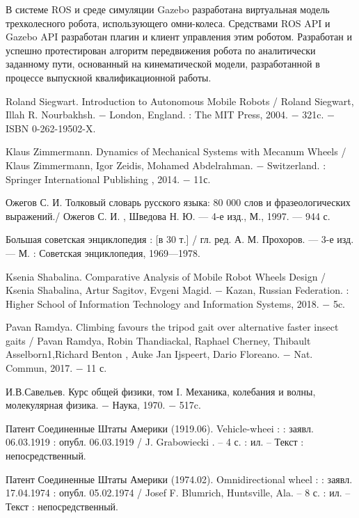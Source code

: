 \documentclass[oneside,final,14pt]{extreport}
\begin{document}
В системе ROS и  среде симуляции Gazebo разработана виртуальная модель трехколесного робота, использующего омни-колеса. Средствами ROS API и Gazebo API разработан плагин и клиент управления этим роботом. Разработан и успешно протестирован алгоритм передвижения робота по аналитически заданному пути, основанный на кинематической модели, разработанной в процессе выпускной квалификационной  работы.
\newpage
\begin{thebibliography}{0}

Roland Siegwart.
Introduction to Autonomous Mobile Robots / Roland Siegwart, Illah R. Nourbakhsh.
$-$ London, England.
: The MIT Press, 2004. $-$ 321c. $-$ ISBN 0-262-19502-X.

Klaus Zimmermann.
Dynamics of Mechanical Systems
with Mecanum Wheels / Klaus Zimmermann, Igor Zeidis, Mohamed Abdelrahman.
$-$ Switzerland. : Springer International Publishing , 2014. $-$ 11с.

Ожегов С. И. Толковый словарь русского языка: 80 000 слов и фразеологических выражений./ Ожегов С. И. , Шведова Н. Ю. — 4-е изд., М., 1997. — 944 с.


Большая советская энциклопедия : [в 30 т.] / гл. ред. А. М. Прохоров. — 3-е изд. — М. : Советская энциклопедия, 1969—1978.

Ksenia Shabalina.
Comparative Analysis of Mobile Robot Wheels
Design
/
Ksenia Shabalina, Artur Sagitov, Evgeni Magid.
$-$  Kazan, Russian Federation. : Higher School of Information Technology and Information Systems,
 2018. $-$ 5c.

Pavan Ramdya.
Climbing favours the tripod gait over alternative
faster insect gaits
/
Pavan Ramdya, Robin Thandiackal, Raphael Cherney, Thibault Asselborn1,Richard Benton ,
Auke Jan Ijspeert, Dario Floreano.
$-$ Nat. Commun, 2017. $-$  11 с.

И.В.Савельев.
Курс общей физики, том I.
Механика, колебания и волны, молекулярная физика.
$-$ Наука, 1970. $-$ 517c.

Патент  Соединенные Штаты Америки (1919.06). Vehicle-wheei :  : заявл. 06.03.1919 : опубл. 06.03.1919 / J. Grabowiecki . – 4 с. : ил. – Текст : непосредственный.

Патент  Соединенные Штаты Америки (1974.02). Omnidirectional wheel :  : заявл. 17.04.1974 : опубл. 05.02.1974 / Josef F. Blumrich, Huntsville, Ala. – 8 с. : ил. – Текст : непосредственный.



\end{thebibliography}
\end{document}
